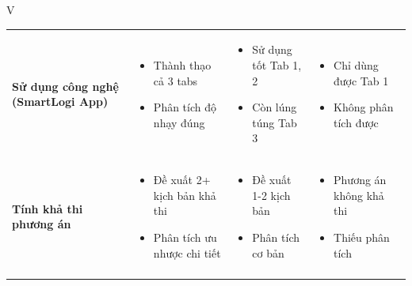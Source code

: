 \documentclass[12pt,a4paper]{article}
\begin{document}
\begin{competitionsection}{V}
\begin{tabularx}{\linewidth}{@{} >{\raggedright\arraybackslash}p{3.2cm} >{\raggedright\arraybackslash}X >{\raggedright\arraybackslash}X >{\raggedright\arraybackslash}X @{}}
    \textbf{Sử dụng công nghệ (SmartLogi App)} 
    & 
    \begin{itemize}[leftmargin=*,noitemsep,topsep=1ex]
        \item Thành thạo cả 3 tabs
        \item Phân tích độ nhạy đúng
    \end{itemize}
    & 
    \begin{itemize}[leftmargin=*,noitemsep,topsep=1ex]
        \item Sử dụng tốt Tab 1, 2
        \item Còn lúng túng Tab 3
    \end{itemize}
    & 
    \begin{itemize}[leftmargin=*,noitemsep,topsep=1ex]
        \item Chỉ dùng được Tab 1
        \item Không phân tích được
    \end{itemize} \\
    \addlinespace
    
    \textbf{Tính khả thi phương án} 
    & 
    \begin{itemize}[leftmargin=*,noitemsep,topsep=1ex]
        \item Đề xuất 2+ kịch bản khả thi
        \item Phân tích ưu nhược chi tiết
    \end{itemize}
    & 
    \begin{itemize}[leftmargin=*,noitemsep,topsep=1ex]
        \item Đề xuất 1-2 kịch bản
        \item Phân tích cơ bản
    \end{itemize}
    & 
    \begin{itemize}[leftmargin=*,noitemsep,topsep=1ex]
        \item Phương án không khả thi
        \item Thiếu phân tích
    \end{itemize} \\
    \addlinespace
    

\end{tabularx}
\end{competitionsection}
\end{document}
